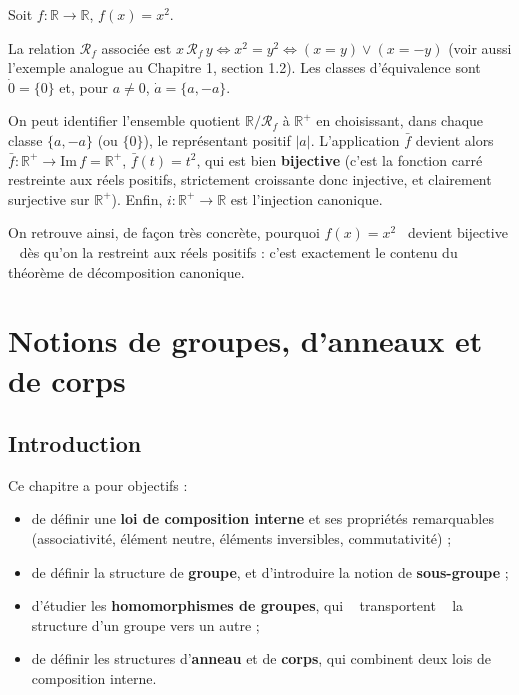 \documentclass[a4paper,12pt,openany]{book}
\providecommand{\og}{\guillemotleft~}
\providecommand{\fg}{\ifhmode~\fi\guillemotright}
\begin{document}
\begin{exemple}[3.7]
Soit $f : \mathbb{R} \to \mathbb{R}$, $f(x)=x^2$.

La relation $\mathcal{R}_f$ associée est $x\,\mathcal{R}_f\,y \iff x^2=y^2
\iff (x=y) \vee (x=-y)$ (voir aussi l'exemple analogue au Chapitre 1,
section 1.2). Les classes d'équivalence sont $\dot 0 = \{0\}$ et, pour
$a\neq0$, $\dot a = \{a,-a\}$.

On peut identifier l'ensemble quotient $\mathbb{R}/\mathcal{R}_f$ à
$\mathbb{R}^+$ en choisissant, dans chaque classe $\{a,-a\}$ (ou $\{0\}$),
le représentant positif $|a|$. L'application $\bar f$ devient alors
$\bar f : \mathbb{R}^+ \to \mathrm{Im}\,f = \mathbb{R}^+$, $\bar f(t) = t^2$,
qui est bien \textbf{bijective} (c'est la fonction carré restreinte aux
réels positifs, strictement croissante donc injective, et clairement
surjective sur $\mathbb{R}^+$). Enfin, $i : \mathbb{R}^+ \to \mathbb{R}$ est
l'injection canonique.

On retrouve ainsi, de façon très concrète, pourquoi $f(x)=x^2$
\og devient bijective \fg{} dès qu'on la restreint aux réels positifs : c'est
exactement le contenu du théorème de décomposition canonique.
\end{exemple}


\chapter{Notions de groupes, d'anneaux et de corps}

\section{Introduction}


Ce chapitre a pour objectifs :
\begin{itemize}
  \item de définir une \textbf{loi de composition interne} et ses
  propriétés remarquables (associativité, élément neutre, éléments
  inversibles, commutativité) ;
  \item de définir la structure de \textbf{groupe}, et d'introduire la
  notion de \textbf{sous-groupe} ;
  \item d'étudier les \textbf{homomorphismes de groupes}, qui \og
  transportent \fg{} la structure d'un groupe vers un autre ;
  \item de définir les structures d'\textbf{anneau} et de \textbf{corps},
  qui combinent deux lois de composition interne.
\end{itemize}
\end{document}

